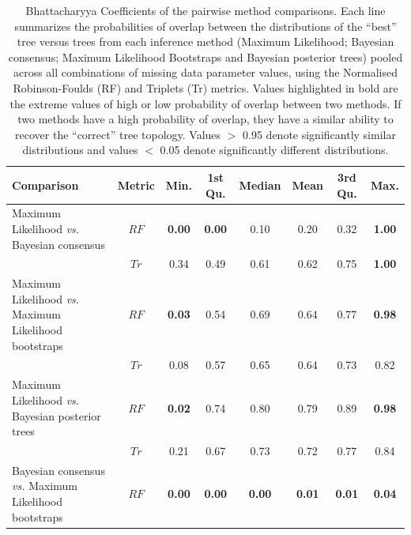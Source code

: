 \begin{landscape}
\begin{table}[!htb]
\caption[Bhattacharyya Coefficients of the pairwise method comparisons.]{Bhattacharyya Coefficients of the pairwise method comparisons.
Each line summarizes the probabilities of overlap between the distributions of the ``best'' tree versus trees from each inference method (Maximum Likelihood; Bayesian consensus; Maximum Likelihood Bootstraps and Bayesian posterior trees) pooled across all combinations of missing data parameter values, using the Normalised Robinson-Foulds (RF) and Triplets (Tr) metrics. 
Values highlighted in bold are the extreme values of high or low probability of overlap between two methods. If two methods have a high probability of overlap, they have a similar ability to recover the ``correct'' tree topology.
Values $>$ 0.95 denote significantly similar distributions and values $<$ 0.05 denote significantly different distributions.}
\centering
\begin{tabular}{lccccccc}
  \hline
 Comparison &  Metric & Min. & 1st Qu. & Median & Mean & 3rd Qu. & Max. \\ 
  \hline
    Maximum Likelihood \textit{vs.} Bayesian consensus                 & $RF$ & \textbf{0.00} & \textbf{0.00} & 0.10 & 0.20 & 0.32 & \textbf{1.00} \\ 
                                                                       & $Tr$ & 0.34 & 0.49 & 0.61 & 0.62 & 0.75 & \textbf{1.00} \\ 
    Maximum Likelihood \textit{vs.} Maximum Likelihood bootstraps      & $RF$ & \textbf{0.03} & 0.54 & 0.69 & 0.64 & 0.77 & \textbf{0.98} \\ 
                                                                       & $Tr$ & 0.08 & 0.57 & 0.65 & 0.64 & 0.73 & 0.82 \\ 
    Maximum Likelihood \textit{vs.} Bayesian posterior trees           & $RF$ & \textbf{0.02} & 0.74 & 0.80 & 0.79 & 0.89 & \textbf{0.98} \\ 
                                                                       & $Tr$ & 0.21 & 0.67 & 0.73 & 0.72 & 0.77 & 0.84 \\ 
    Bayesian consensus \textit{vs.} Maximum Likelihood bootstraps      & $RF$ & \textbf{0.00} & \textbf{0.00} & \textbf{0.00} & \textbf{0.01} & \textbf{0.01} & \textbf{0.04} \\ 

\end{tabular}
\end{table}
\end{landscape}
